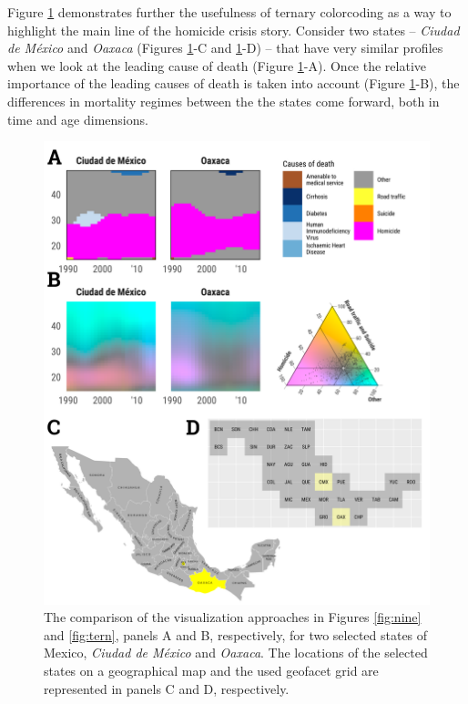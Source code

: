 \documentclass[10pt, twoside, parskip=half]{article}
\begin{document}
Figure \ref{fig:four} demonstrates further the usefulness of ternary colorcoding as a way to highlight the main line of the homicide crisis story. Consider two states -- \emph{Ciudad de México} and \emph{Oaxaca} (Figures \ref{fig:four}-C and \ref{fig:four}-D) -- that have very similar profiles when we look at the leading cause of death (Figure \ref{fig:four}-A). Once the relative importance of the leading causes of death is taken into account (Figure \ref{fig:four}-B), the differences in mortality regimes between the the states come forward, both in time and age dimensions.



\begin{figure}[!t]
\includegraphics[width=1\linewidth]{fig/gg-four} \caption{The comparison of the visualization approaches in Figures \ref{fig:nine} and \ref{fig:tern}, panels A and B, respectively, for two selected states of Mexico, \emph{Ciudad de México} and \emph{Oaxaca}. The locations of the selected states on a geographical map and the used geofacet grid are represented in panels C and D, respectively.}\label{fig:four}
\end{figure}
\end{document}
